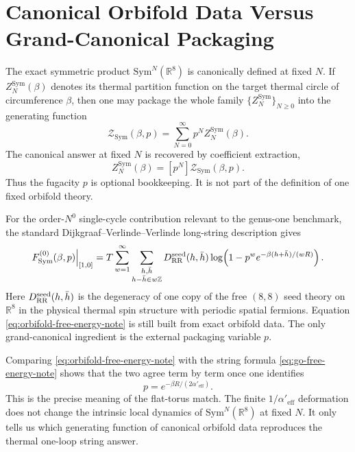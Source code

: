 \documentclass[11pt]{article}
\newcommand{\Aeff}{\alpha'_{\mathrm{eff}}}
\newcommand{\Sym}{\mathrm{Sym}}
\newcommand{\mc}[1]{\mathcal{#1}}
\newcommand{\bR}{\mathbb{R}}
\begin{document}
\section{Canonical Orbifold Data Versus Grand-Canonical Packaging}
The exact symmetric product $\Sym^N(\bR^8)$ is canonically defined at fixed $N$. If $Z_N^{\Sym}(\beta)$ denotes its thermal partition function on the target thermal circle of circumference $\beta$, then one may package the whole family $\{Z_N^{\Sym}\}_{N\ge 0}$ into the generating function
\begin{equation}\label{eq:orbifold-generating-function}
\mc Z_{\Sym}(\beta,p)=\sum_{N=0}^{\infty} p^N Z_N^{\Sym}(\beta).
\end{equation}
The canonical answer at fixed $N$ is recovered by coefficient extraction,
\begin{equation}\label{eq:coefficient-extraction}
Z_N^{\Sym}(\beta)=[p^N]\mc Z_{\Sym}(\beta,p).
\end{equation}
Thus the fugacity $p$ is optional bookkeeping. It is not part of the definition of one fixed orbifold theory.

For the order-$N^0$ single-cycle contribution relevant to the genus-one benchmark, the standard Dijkgraaf--Verlinde--Verlinde long-string description \cite{dijkgraaf1997matrixstring,dijkgraaf1997ellipticgenerasymmetricproducts,arutyunov1998orbifoldscattering} gives
\begin{equation}\label{eq:orbifold-free-energy-note}
F_{\Sym}^{(0)}(\beta,p)\Big|_{[1,0]}
=
T\sum_{w=1}^{\infty}
\sum_{\substack{h,\bar h\\ h-\bar h\in w\mathbb Z}}
D_{\rm RR}^{\mathrm{seed}}(h,\bar h)
\log\!\left(
1-p^w e^{-\beta(h+\bar h)/(wR)}
\right).
\end{equation}
Here $D_{\rm RR}^{\mathrm{seed}}(h,\bar h)$ is the degeneracy of one copy of the free $(8,8)$ seed theory on $\bR^8$ in the physical thermal spin structure with periodic spatial fermions. Equation \eqref{eq:orbifold-free-energy-note} is still built from exact orbifold data. The only grand-canonical ingredient is the external packaging variable $p$.

Comparing \eqref{eq:orbifold-free-energy-note} with the string formula \eqref{eq:go-free-energy-note} shows that the two agree term by term once one identifies
\begin{equation}\label{eq:benchmark-match}
p=e^{-\beta R/(2\Aeff)}.
\end{equation}
This is the precise meaning of the flat-torus match. The finite $1/\Aeff$ deformation does not change the intrinsic local dynamics of $\Sym^N(\bR^8)$ at fixed $N$. It only tells us which generating function of canonical orbifold data reproduces the thermal one-loop string answer.
\end{document}
